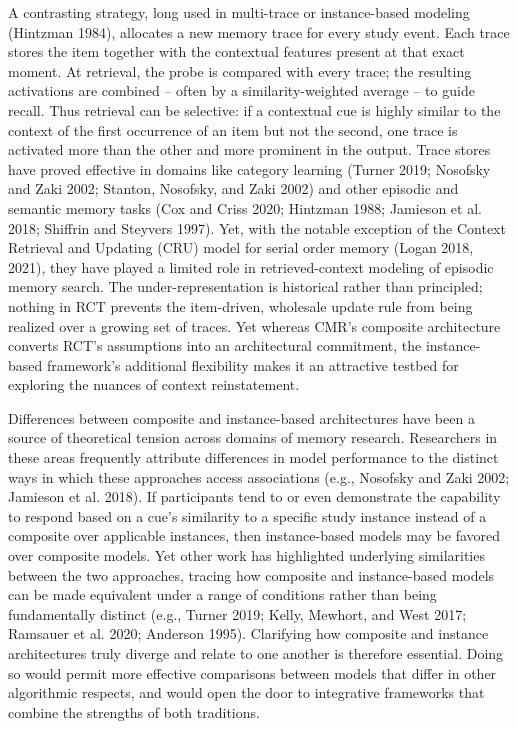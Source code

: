 \documentclass[
  letterpaper,
  11pt,
  english,
  singlespacing,
  headsepline]{MastersDoctoralThesis}
\begin{document}
A contrasting strategy, long used in multi-trace or instance-based
modeling (Hintzman 1984), allocates a new memory trace for every study
event. Each trace stores the item together with the contextual features
present at that exact moment. At retrieval, the probe is compared with
every trace; the resulting activations are combined -- often by a
similarity-weighted average -- to guide recall. Thus retrieval can be
selective: if a contextual cue is highly similar to the context of the
first occurrence of an item but not the second, one trace is activated
more than the other and more prominent in the output. Trace stores have
proved effective in domains like category learning (Turner 2019;
Nosofsky and Zaki 2002; Stanton, Nosofsky, and Zaki 2002) and other
episodic and semantic memory tasks (Cox and Criss 2020; Hintzman 1988;
Jamieson et al. 2018; Shiffrin and Steyvers 1997). Yet, with the notable
exception of the Context Retrieval and Updating (CRU) model for serial
order memory (Logan 2018, 2021), they have played a limited role in
retrieved-context modeling of episodic memory search. The
under-representation is historical rather than principled; nothing in
RCT prevents the item-driven, wholesale update rule from being realized
over a growing set of traces. Yet whereas CMR's composite architecture
converts RCT's assumptions into an architectural commitment, the
instance-based framework's additional flexibility makes it an attractive
testbed for exploring the nuances of context reinstatement.

Differences between composite and instance-based architectures have been
a source of theoretical tension across domains of memory research.
Researchers in these areas frequently attribute differences in model
performance to the distinct ways in which these approaches access
associations (e.g., Nosofsky and Zaki 2002; Jamieson et al. 2018). If
participants tend to or even demonstrate the capability to respond based
on a cue's similarity to a specific study instance instead of a
composite over applicable instances, then instance-based models may be
favored over composite models. Yet other work has highlighted underlying
similarities between the two approaches, tracing how composite and
instance-based models can be made equivalent under a range of conditions
rather than being fundamentally distinct (e.g., Turner 2019; Kelly,
Mewhort, and West 2017; Ramsauer et al. 2020; Anderson 1995). Clarifying
how composite and instance architectures truly diverge and relate to one
another is therefore essential. Doing so would permit more effective
comparisons between models that differ in other algorithmic respects,
and would open the door to integrative frameworks that combine the
strengths of both traditions.
\end{document}
